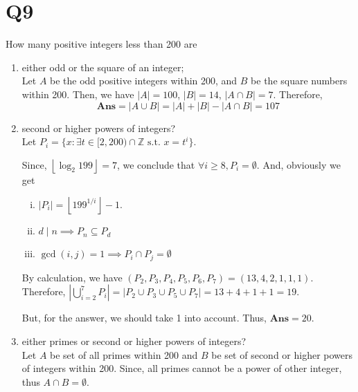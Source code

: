 \documentclass[11pt]{article}
\newenvironment{qparts}{\begin{enumerate}[{(}a{)}]}{\end{enumerate}}
\begin{document}
\section*{Q9}
How many positive integers less than 200 are
\begin{qparts}
    
    \item either odd or the square of an integer;\\
    Let $A$ be the odd positive integers within 200, and 
    $B$ be the square numbers within 200.
    Then, we have $\left\vert A  \right\vert =100$, 
    $\left\vert B \right\vert = 14$, $\left\vert A \cap B \right\vert=7 $. Therefore, 
    \begin{equation*}
        \textbf{Ans}=\left\vert A \cup B  \right\vert
            = \left\vert  A\right\vert +\left\vert B  \right\vert -\left\vert A \cap B \right\vert=107
    \end{equation*}


    \item second or higher powers of integers?\\
    Let $P_{i}=\{ x\colon  \exists t \in [2,200) \cap \mathbb{Z} \text{ s.t. } x=t^{i} \}$.  

    Since, $\left\lfloor \log_2 199 \right\rfloor=7$, we conclude that 
    $\forall i \ge 8, P_{i }=\emptyset$. And, obviously we get
    \begin{enumerate}[i. ]
        
        \item $\left\vert P_{i } \right\vert =\left\lfloor 199^{1 / i} \right\rfloor-1$. 
        \item $d \mid n \implies P_{n} \subseteq P_{d}$
        \item $\operatorname{gcd}(i,j)=1 \implies P_{i }\cap P_{j }=\emptyset$
    \end{enumerate}
    By calculation, we have $(P_2,P_3,P_4,P_5,P_6,P_7)=(13,4,2,1,1,1)$. 
    Therefore, $\left\vert \bigcup_{i=2}^{7}P_{i } \right\vert =\left\vert P_{2} \cup P_{3} \cup P_{5} \cup P_7 \right\vert =13+4+1+1=19$.

    But, for the answer, we should take 1 into account. Thus, $\textbf{Ans}=20$.


    \item  either primes or second or higher powers of integers?\\
    Let $A$ be set of all primes within 200 
    and $B$ be set of second or higher powers of integers within 200.
    Since, all primes cannot be a power of other integer, thus $A \cap B=\emptyset$.


\end{qparts}
\end{document}
